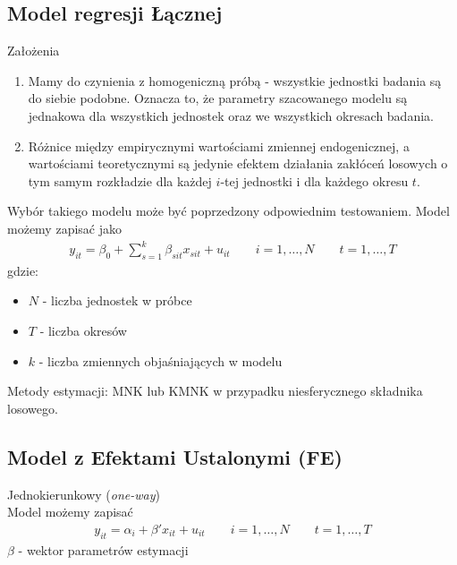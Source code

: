 \subsection{Model regresji Łącznej}
Założenia
\begin{enumerate}
\item Mamy do czynienia z homogeniczną próbą - wszystkie jednostki badania są do siebie podobne. Oznacza to, że parametry szacowanego modelu są jednakowa dla wszystkich jednostek oraz we wszystkich okresach badania.
\item Różnice między empirycznymi wartościami zmiennej endogenicznej, a wartościami teoretycznymi są jedynie efektem działania zakłóceń losowych o tym samym rozkładzie dla każdej $ i $-tej jednostki i dla każdego okresu $ t $.
\end{enumerate}
Wybór takiego modelu może być poprzedzony odpowiednim testowaniem.
Model możemy zapisać jako
\begin{gather*}
y_{it}=\beta_0+\sum_{s=1}^{k}\beta_{sit}x_{sit}+u_{it}
\qquad i=1,\dots,N
\qquad t=1,\dots,T
\end{gather*}
gdzie:
\begin{itemize}
\item $ N $ - liczba jednostek w próbce
\item $ T $ - liczba okresów
\item $ k $ - liczba zmiennych objaśniających w modelu
\end{itemize}
Metody estymacji: MNK lub KMNK w przypadku niesferycznego składnika losowego.
\subsection{Model z Efektami Ustalonymi (FE)}
Jednokierunkowy (\textit{one-way})\\
Model możemy zapisać
\begin{gather*}
y_{it}=\alpha_{i}+\beta'x_{it}+u_{it}
\qquad i=1,\dots,N
\qquad t=1,\dots,T
\end{gather*}
$ \beta $ - wektor parametrów estymacji

